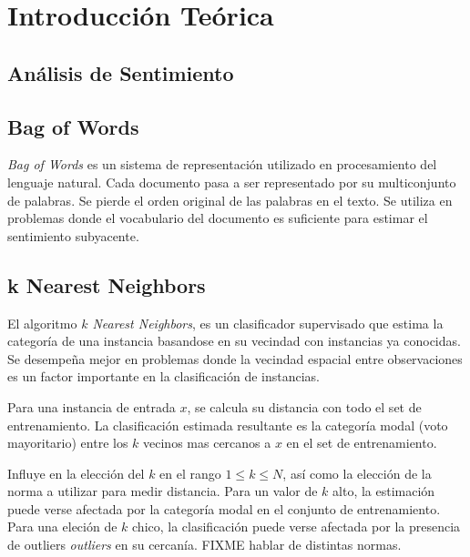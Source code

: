 \section{Introducción Teórica}%
\label{sec:introduccion_teorica}

\subsection{Análisis de Sentimiento}%
\label{sub:analisis_de_sentimiento}

\subsection{Bag of Words}%
\label{sub:bag_of_words}

\textit{Bag of Words} es un sistema de representación utilizado en
procesamiento del lenguaje natural. Cada documento pasa a ser representado por
su multiconjunto de palabras. Se pierde el orden original de las palabras en el
texto. Se utiliza en problemas donde el vocabulario del documento es suficiente
para estimar el sentimiento subyacente.



\subsection{k Nearest Neighbors}%
\label{sub:k_nearest_neighbors}

El algoritmo \textit{$k$ Nearest Neighbors}, \knn{} es un clasificador
supervisado que estima la categoría de una instancia basandose en su vecindad
con instancias ya conocidas.
Se desempeña mejor en problemas donde la vecindad espacial entre
observaciones es un factor importante en la clasificación de instancias.

Para una instancia de entrada $x$, se calcula su distancia con todo el set de
entrenamiento. La clasificación estimada resultante es la categoría modal (voto
mayoritario) entre los $k$ vecinos mas cercanos a $x$ en el set de
entrenamiento.

Influye en \knn{} la elección del $k$ en el rango $1 \leq k \leq N$, así como
la elección de la norma a utilizar para medir distancia.
Para un valor de $k$ alto, la estimación puede verse afectada por la categoría
modal en el conjunto de entrenamiento.
Para una eleción de $k$ chico, la clasificación puede verse afectada por la
presencia de outliers \textit{outliers} en su cercanía.
FIXME hablar de distintas normas.

